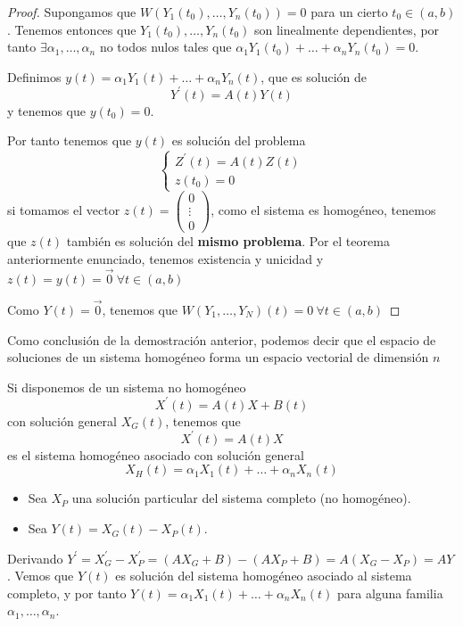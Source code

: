 \begin{proof}
Supongamos que $W(Y_1(t_0), \hdots, Y_n(t_0)) = 0$ para un cierto $t_0 \in (a,b)$. Tenemos entonces que $Y_1(t_0), \hdots, Y_n(t_0)$ son linealmente dependientes, por tanto $\exists \alpha_1,\hdots,\alpha_n$ no todos nulos tales que $\alpha_1Y_1(t_0)+\hdots+\alpha_nY_n(t_0) = 0$.

Definimos $y(t) = \alpha_1Y_1(t)+\hdots+\alpha_nY_n(t)$, que es solución de $$Y^\prime(t) = A(t)Y(t)$$ y tenemos que $y(t_0) = 0$.

Por tanto tenemos que $y(t)$ es solución del problema
\begin{equation*}
  \left\lbrace
  \begin{array}{l}
     Z^\prime(t) = A(t)Z(t)\\
     z(t_0) = 0
  \end{array}
  \right.
\end{equation*}
si tomamos el vector $z(t) = \begin{pmatrix}
0\\\vdots\\0
\end{pmatrix}$, como el sistema es homogéneo, tenemos que $z(t)$ también es solución del \textbf{mismo problema}. Por el teorema anteriormente enunciado, tenemos existencia y unicidad y $z(t) = y(t) = \vec{0}\ \forall t \in (a,b)$

Como $Y(t) = \vec{0}$, tenemos que $W(Y_1,\hdots,Y_N)(t) = 0\ \forall t\in (a,b)$
\end{proof}

Como conclusión de la demostración anterior, podemos decir que el espacio de soluciones de un sistema homogéneo forma un espacio vectorial de dimensión $n$

\vspace{5mm}
\obs

Si disponemos de un sistema no homogéneo $$X^\prime(t) = A(t)X+B(t)$$
con solución general $X_G(t)$, tenemos que $$X^\prime(t) = A(t)X$$ es el sistema homogéneo asociado con solución general $$X_H(t) = \alpha_1X_1(t)+\hdots+\alpha_nX_n(t)$$

\begin{itemize}
\item Sea $X_P$ una solución particular del sistema completo (no homogéneo).

\item Sea $Y(t) = X_G(t)-X_P(t)$.
\end{itemize}
\noindent Derivando $Y^\prime = X_G^\prime -X_P^\prime = (AX_G+B)-(AX_P+B) = A(X_G-X_P) = AY$.
Vemos que $Y(t)$ es solución del sistema homogéneo asociado al sistema completo, y por tanto $Y(t) = \alpha_1X_1(t)+\hdots+\alpha_nX_n(t)$ para alguna familia $\alpha_1,\hdots,\alpha_n$.

